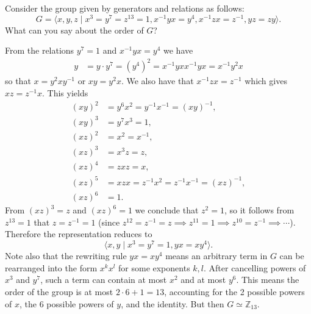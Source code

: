 \documentclass{article}
\newcounter{Problem}
\newenvironment{Problem}{\begin{Exercise}[name={Problem},
                                          counter={Problem}]}
                        {\end{Exercise}}
\begin{document}
\begin{Problem}
Consider the group given by generators and relations as follows:
$$
G = \langle
      x, y, z
    \mid
      x^3 = y^7 = z^{13} = 1,
      x^{-1} y x = y^4,
      x^{-1} z x = z^{-1},
      yz = zy
    \rangle.
$$
What can you say about the order of $G$?
\end{Problem}

\begin{Answer}
From the relations $y^7 = 1$ and $x^{-1} y x = y^4$ we have
\begin{align*}
   y
&= y \cdot y^7
 = (y^4)^2
 = x^{-1} y x x^{-1} y x
 = x^{-1} y^2 x
\end{align*}
so that $x = y^2 x y^{-1}$ or $xy = y^2 x$.
We also have that $x^{-1}zx = z^{-1}$ which gives
$xz = z^{-1}x$. This yields
\begin{align*}
(xy)^2 &= y^6 x^2 = y^{-1} x^{-1} = (xy)^{-1}, \\
(xy)^3 &= y^7 x^3 = 1, \\
(xz)^2 &= x^2 = x^{-1}, \\
(xz)^3 &= x^3z = z, \\
(xz)^4 &= zxz = x, \\
(xz)^5 &= xzx = z^{-1} x^2 = z^{-1} x^{-1} = (xz)^{-1}, \\
(xz)^6 &= 1.
\end{align*}
From $(xz)^3 = z$ and $(xz)^6 = 1$ we conclude that $z^2 = 1$, so
it follows from $z^{13} = 1$ that $z = z^{-1} = 1$
(since
$z^{12} = z^{-1} = z \implies z^{11} = 1 \implies z^{10} = z^{-1}
\implies \cdots$).
Therefore the representation reduces to
$$
\langle x, y \mid x^3 = y^7 = 1, yx = xy^4 \rangle.
$$
Note also that the rewriting rule $yx = xy^4$ means an arbitrary term
in $G$ can be rearranged into the form $x^k x^l$ for some exponents
$k, l$. After cancelling powers of
$x^3$ and $y^7$, such a term can contain at most $x^2$ and at most
$y^6$. This means the order of the group is at most $2 \cdot 6 + 1 = 13$,
accounting for the 2 possible powers of $x$, the 6 possible powers of
$y$, and the identity. But then $G \simeq \mathbb{Z}_{13}$.
\end{Answer}

\pagebreak
\end{document}
